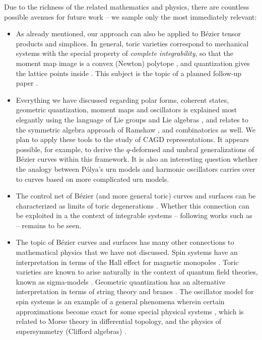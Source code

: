 \documentclass[12pt,final,3p]{elsarticle}
\begin{document}
Due to the richness of the related mathematics and physics, there are countless possible avenues for future work -- we sample only the most immediately relevant:
\begin{itemize}
	\item As already mentioned, our approach can also be applied to B\'{e}zier tensor products and simplices. In general, toric varieties correspond to mechanical systems with the special property of \emph{complete integrability}, so that the moment map image is a convex (Newton) polytope \cite{atiyah1983angular,delzant1988hamiltoniens}, and quantization gives the lattice points inside \cite{vergne1996convex,hamilton2007quantization}. This subject is the topic of a planned follow-up paper \cite{vaitkus2018surface}.
	\item Everything we have discussed regarding polar forms, coherent states, geometric quantization, moment maps and oscillators is explained most elegantly using the language of Lie groups and Lie algebras \cite{singer2006linearity,sattinger1986lie,fulton1991representation}, and relates to the symmetric algebra approach of Ramshaw \cite{ramshaw2001paired}, and  combinatorics \cite{blasiak2011combinatorial} as well. We plan to apply these tools to the study of CAGD representations. It appears possible, for example, to derive the $q$-deformed \cite{goldman2015quantum} and umbral \cite{winkel2014generalization} generalizations of B\'{e}zier curves within this framework. It is also an interesting question whether the analogy between P\'{o}lya's urn models and harmonic oscillators carries over to curves based on more complicated urn models.
	\item The control net of B\'{e}zier (and more general toric) curves and surfaces can be characterized as limits of toric degenerations \cite{garc2011toric}. Whether this connection can be exploited in a the context of integrable systems -- following works such as \cite{harada2015integrable} -- remains to be seen. 
	\item The topic of B\'{e}zier curves and surfaces has many other connections to mathematical physics that we have not discussed. Spin systems have an interpretation in terms of the Hall effect for magnetic monopoles \cite{hasebe2013topological}. Toric varieties are known to arise naturally in the context of quantum field theories, known as sigma-models \cite{witten1993phases,hori2003mirror}. Geometric quantization has an alternative interpretation in terms of string theory and branes \cite{gukov2008branes}. The oscillator model for spin systems is an example of a general phenomena wherein certain approximations become exact for some special physical systems \cite{szabo2003equivariant}, which is related to Morse theory in differential topology, and the physics of supersymmetry (Clifford algebras) \cite{witten1982supersymmetry,stone1989supersymmetry} .

\end{itemize}
\end{document}
